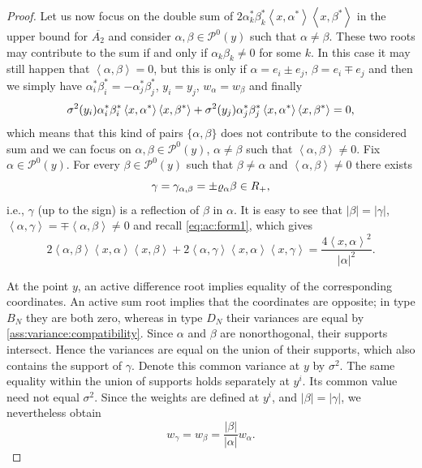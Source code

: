 \documentclass{article}
\numberwithin{equation}{section}
\newcommand{\xa}{\left<x,\alpha\right>}
\newcommand{\xb}{\left<x,\beta\right>}
\newcommand{\xc}{\left<x,\gamma\right>}
\newcommand{\xas}{\left<x,\alpha^*\right>}
\newcommand{\xbs}{\left<x,\beta^*\right>}
\newcommand{\ab}{\left<\alpha,\beta\right>}
\newcommand{\ac}{\left<\alpha,\gamma\right>}
\newcommand{\reflect}[1]{\varrho_{#1}}
\newcommand{\Pzero}{\mathcal{P}^0(y)}
\theoremstyle{plain}
\begin{document}
\begin{proof}
Let us now focus on the double sum of $2\alpha^*_k\beta^*_k\xas\xbs$ in the upper bound for $\overline{A_2}$ and consider $\alpha, \beta\in\Pzero$ such that $\alpha\neq \beta$. These two roots may contribute to the sum if and only if $\alpha_k\beta_k\neq 0$ for some $k$. In this case it may still happen that $\ab=0$, but this is only if $\alpha=e_i\pm e_j$, $\beta=e_i\mp e_j$ and then we simply have $\alpha_i^*\beta_i^*=-\alpha_j^*\beta_j^*$, $y_i=y_j$, $w_\alpha=w_\beta$ and finally
\begin{equation*}
\sigma^2(y_i)\alpha_i^*\beta_i^*\xas\xbs+\sigma^2(y_j)\alpha_j^*\beta_j^*\xas\xbs =0\/,
\end{equation*}
which means that this kind of pairs $\{\alpha,\beta\}$ does not contribute to the considered sum and we can focus on $\alpha,\beta\in \Pzero$, $\alpha\neq \beta$ such that $\ab\neq 0$.
Fix $\alpha\in \Pzero$. For every $\beta\in \Pzero$ such that $\beta\neq \alpha$ and $\ab\neq 0$ there exists 
\begin{equation*}
\gamma=\gamma_{\alpha,\beta} = \pm\reflect{\alpha}\beta\in R_+\/,
\end{equation*}
i.e., $\gamma$ (up to the sign) is a reflection of $\beta$ in $\alpha$. It is easy to see that $|\beta|=|\gamma|$,  $\ac = \mp \ab \neq 0$ and recall \eqref{eq:ac:form1}, which gives
\begin{equation}
    \label{eq:inner}
    2\ab \xa\xb+	2\ac \xa\xc = \frac{4\xa^2}{|\alpha|^2}.
\end{equation}

At the point $y$, an active difference root implies equality of the corresponding coordinates. An active sum root implies that the coordinates are opposite; in type $B_N$ they are both zero, whereas in type $D_N$ their variances are equal by \ref{ass:variance:compatibility}. Since $\alpha$ and $\beta$ are nonorthogonal, their supports intersect. Hence the variances are equal on the union of their supports, which also contains the support of $\gamma$. Denote this common variance at $y$ by $\sigma^2$. The same equality within the union of supports holds separately at $y^i$. Its common value need not equal $\sigma^2$. Since the weights are defined at $y^i$, and $|\beta|=|\gamma|$, we nevertheless obtain
    \begin{equation*}
        w_\gamma=w_\beta =\frac{|\beta|}{|\alpha|}w_\alpha.
    \end{equation*}


\end{proof}
\end{document}
